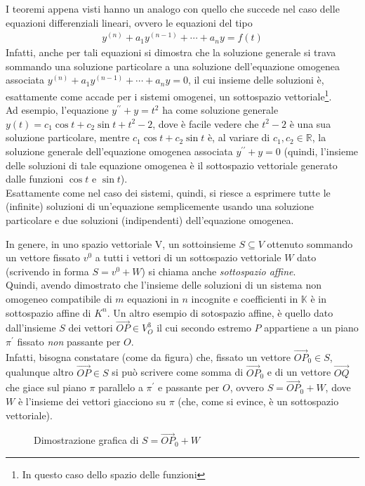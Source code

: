 \begin{oss}
  \label{oss:gauss-jordan2}
  I teoremi appena visti hanno un analogo con quello che succede nel caso delle equazioni
  differenziali lineari, ovvero le equazioni del tipo
  \begin{eqnarray*}
    y^{(n)}+a_1y^{(n-1)}+\cdots+a_ny=f(t)
  \end{eqnarray*}
  Infatti, anche per tali equazioni si dimostra che la soluzione generale si trava
  sommando una soluzione particolare a una soluzione dell'equazione omogenea associata
  $y^{(n)}+a_1y^{(n-1)}+\cdots+a_ny=0$, il cui insieme delle soluzioni è, esattamente come
  accade per i sistemi omogenei, un sottospazio vettoriale\footnote{In questo caso dello
    spazio delle funzioni}.\\
  Ad esempio, l'equazione $y^{\prime\prime}+y=t^2$ ha come soluzione generale
  $y(t)=c_1\cos t+ c_2\sin t+t^2-2$, dove è facile vedere che $t^2-2$ è una sua soluzione
  particolare, mentre $c_1\cos t +c_2\sin t$ è, al variare di $c_1,c_2\in \mathds{R}$, la
  soluzione generale dell'equazione omogenea associata $y^{\prime\prime}+y=0$ (quindi, l'insieme
  delle soluzioni di tale equazione omogenea è il sottospazio vettoriale generato dalle
  funzioni $\cos t$ e $\sin t$).\\
  Esattamente come nel caso dei sistemi, quindi, si riesce a esprimere tutte le (infinite) soluzioni
  di un'equazione semplicemente usando una soluzione particolare e due soluzioni (indipendenti)
  dell'equazione omogenea.
\end{oss}
In genere, in uno spazio vettoriale V, un sottoinsieme $S\subseteq V$ ottenuto sommando un vettore
fissato $v^0$ a tutti i vettori di un sottospazio vettoriale $W$ dato (scrivendo in forma $S=v^0+W$)
si chiama anche \textit{sottospazio affine}.\\
Quindi, avendo dimostrato che l'insieme delle soluzioni di un sistema non omogeneo compatibile di
$m$ equazioni in $n$ incognite e coefficienti in $\mathds{K}$ è in sottospazio affine di $K^n$.
Un altro esempio di sotospazio affine, è quello dato dall'insieme $S$ dei vettori $\vec{OP}\in V^3_O$
il cui secondo estremo $P$ appartiene a un piano $\pi^\prime$ fissato \textit{non} passante per $O$.\\
Infatti, bisogna constatare (come da figura) che, fissato un vettore $\vec{OP}_0\in S$, qualunque altro
$\vec{OP}\in S$ si può scrivere come somma di $\vec{OP}_0$ e di un vettore $\vec{OQ}$ che giace sul
piano $\pi$ parallelo a $\pi^\prime$ e passante per $O$, ovvero $S=\vec{OP}_0+W$, dove $W$ è l'insieme
dei vettori giacciono su $\pi$ (che, come si evince, è un sottospazio vettoriale).
\begin{figure}[ht!]
  \centering
  
  \caption{Dimostrazione grafica di $S=\vec{OP}_0+W$}
  \label{fig:OP0piuW}
\end{figure}

